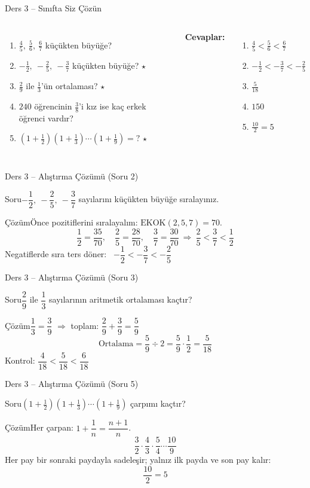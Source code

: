 \documentclass[aspectratio=169,11pt]{beamer}
\newcommand{\soru}[3]{%
\begin{frame}{#1}
  \begin{block}{Soru}\large #2\end{block}
  \pause
  \begin{exampleblock}{Çözüm}\large #3\end{exampleblock}
\end{frame}}
\begin{document}
\begin{frame}{Ders 3 -- Sınıfta Siz Çözün}
\begin{columns}[t]
\begin{enumerate}
\item \(\frac{4}{5},\ \frac{5}{6},\ \frac{6}{7}\) küçükten büyüğe?
\item \(-\frac{1}{2},\ -\frac{2}{5},\ -\frac{3}{7}\) küçükten büyüğe? \(\star\)
\item \(\frac{2}{9}\) ile \(\frac{1}{3}\)'ün ortalaması? \(\star\)
\item \(240\) öğrencinin \(\frac{3}{8}\)'i kız ise kaç erkek öğrenci vardır?
\item \(\left(1+\frac{1}{2}\right)\left(1+\frac{1}{3}\right)\cdots\left(1+\frac{1}{9}\right)=?\) \(\star\)
\end{enumerate}
\pause
\textbf{Cevaplar:}
\begin{enumerate}
\item \(\frac{4}{5}<\frac{5}{6}<\frac{6}{7}\)
\item \(-\frac{1}{2}<-\frac{3}{7}<-\frac{2}{5}\)
\item \(\frac{5}{18}\)
\item \(150\)
\item \(\frac{10}{2}=5\)
\end{enumerate}
\end{columns}
\vspace{4pt}{\footnotesize \(\star\) işaretli soruların adım adım çözümü sonraki slaytlardadır.}
\end{frame}

\soru{Ders 3 -- Alıştırma Çözümü (Soru 2)}
{\(-\dfrac{1}{2},\ -\dfrac{2}{5},\ -\dfrac{3}{7}\) sayılarını küçükten büyüğe sıralayınız.}
{Önce pozitiflerini sıralayalım: \(\text{EKOK}(2,5,7)=70\).
\[\frac{1}{2}=\frac{35}{70},\quad \frac{2}{5}=\frac{28}{70},\quad \frac{3}{7}=\frac{30}{70}\ \Rightarrow\ \frac{2}{5}<\frac{3}{7}<\frac{1}{2}\]
Negatiflerde sıra ters döner: \ \(-\dfrac{1}{2}<-\dfrac{3}{7}<-\dfrac{2}{5}\)}

\soru{Ders 3 -- Alıştırma Çözümü (Soru 3)}
{\(\dfrac{2}{9}\) ile \(\dfrac{1}{3}\) sayılarının aritmetik ortalaması kaçtır?}
{\(\dfrac{1}{3}=\dfrac{3}{9}\) \(\Rightarrow\) toplam: \(\dfrac{2}{9}+\dfrac{3}{9}=\dfrac{5}{9}\)
\[\text{Ortalama}=\frac{5}{9}\div 2=\frac{5}{9}\cdot\frac{1}{2}=\frac{5}{18}\]
Kontrol: \(\dfrac{4}{18}<\dfrac{5}{18}<\dfrac{6}{18}\) \checkmark}

\soru{Ders 3 -- Alıştırma Çözümü (Soru 5)}
{\(\left(1+\frac{1}{2}\right)\left(1+\frac{1}{3}\right)\cdots\left(1+\frac{1}{9}\right)\) çarpımı kaçtır?}
{Her çarpan: \(1+\dfrac{1}{n}=\dfrac{n+1}{n}\).
\[\frac{3}{2}\cdot\frac{4}{3}\cdot\frac{5}{4}\cdots\frac{10}{9}\]
Her pay bir sonraki paydayla sadeleşir; yalnız ilk payda ve son pay kalır:
\[\frac{10}{2}=5\]}
\end{document}

